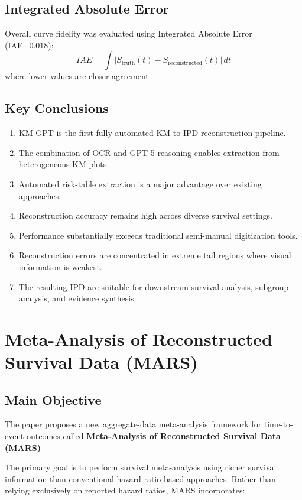 \documentclass[11pt]{article}
\begin{document}
\subsection*{Integrated Absolute Error}

Overall curve fidelity was evaluated using Integrated Absolute Error (IAE=0.018):\[IAE=\int |S_{\text{truth}}(t)-S_{\text{reconstructed}}(t)|\,dt\]where lower values are closer agreement.

\subsection*{Key Conclusions}

\begin{enumerate}
    \item KM-GPT is the first fully automated KM-to-IPD reconstruction pipeline.
    \item The combination of OCR and GPT-5 reasoning enables extraction from heterogeneous KM plots.
    \item Automated risk-table extraction is a major advantage over existing approaches.
    \item Reconstruction accuracy remains high across diverse survival settings.
    \item Performance substantially exceeds traditional semi-manual digitization tools.
    \item Reconstruction errors are concentrated in extreme tail regions where visual information is weakest.
    \item The resulting IPD are suitable for downstream survival analysis, subgroup analysis, and evidence synthesis.
\end{enumerate}

\section{Meta-Analysis of Reconstructed Survival Data (MARS)}

\subsection*{Main Objective}

The paper proposes a new aggregate-data meta-analysis framework for time-to-event outcomes called \textbf{Meta-Analysis of Reconstructed Survival Data (MARS)}

The primary goal is to perform survival meta-analysis using richer survival information than conventional hazard-ratio-based approaches. Rather than relying exclusively on reported hazard ratios, MARS incorporates:
\end{document}
